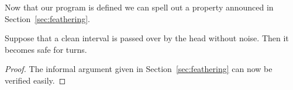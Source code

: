\documentclass[11pt]{memoir}
\theoremstyle{definition} %
\def\B{B}
\newcommand{\Noise}{\mathit{Noise}}
\newcommand{\Tu}{T}
\newcommand{\Tus}{T^{*}}
\begin{document}


Now that our program is defined we can spell out a property announced in Section~\ref{sec:feathering}.

\begin{lemma}\label{lem:safe-for-turns}
  Suppose that a clean interval is passed over by the head without noise.
  Then it becomes safe for turns.  
\end{lemma}
\begin{proof}
  The informal argument given in Section~\ref{sec:feathering} can now be verified easily.
\end{proof}
\end{document}
